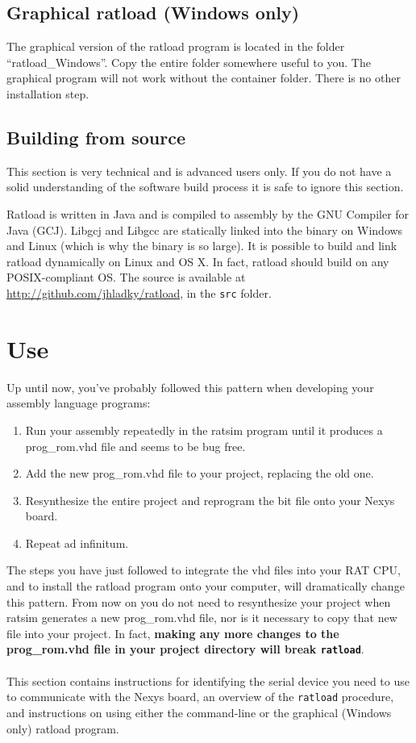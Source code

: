 \documentclass[notitlepage]{article}
\newcommand{\infosign}{\fontencoding{U}\fontfamily{futs}\huge\selectfont\char 116\relax}
\begin{document}
\subsection{Graphical ratload (Windows only)}
The graphical version of the ratload program is located in the folder ``ratload\_Windows''. Copy the entire folder somewhere useful to you. The graphical program will not work without the container folder. There is no other installation step.

\subsection{Building from source}
\label{sec:source_build}
\begin{infobox}
  {\infosign} This section is very technical and is advanced users only. If you do not have a solid understanding of the software build process it is safe to ignore this section.
\end{infobox}

Ratload is written in Java and is compiled to assembly by the GNU Compiler for Java (GCJ). Libgcj and Libgcc are statically linked into the binary on Windows and Linux (which is why the binary is so large). It is possible to build and link ratload dynamically on Linux and OS X. In fact, ratload should build on any POSIX-compliant OS. The source is available at \url{http://github.com/jhladky/ratload}, in the \texttt{src} folder.

\section{Use}
Up until now, you've probably followed this pattern when developing your assembly language programs:
\begin{enumerate}
\item Run your assembly repeatedly in the ratsim program until it produces a prog\_rom.vhd file and seems to be bug free.
\item Add the new prog\_rom.vhd file to your project, replacing the old one.
\item Resynthesize the entire project and reprogram the bit file onto your Nexys board.
\item Repeat ad infinitum.
\end{enumerate}
The steps you have just followed to integrate the vhd files into your RAT CPU, and to install the ratload program onto your computer, will dramatically change this pattern. From now on you do not need to resynthesize your project when ratsim generates a new prog\_rom.vhd file, nor is it necessary to copy that new file into your project. In fact, \textbf{making any more changes to the prog\_rom.vhd file in your project directory will break \texttt{ratload}}.\\\\
This section contains instructions for identifying the serial device you need to use to communicate with the Nexys board, an overview of the \texttt{ratload} procedure, and instructions on using either the command-line or the graphical (Windows only) ratload program.
\end{document}
